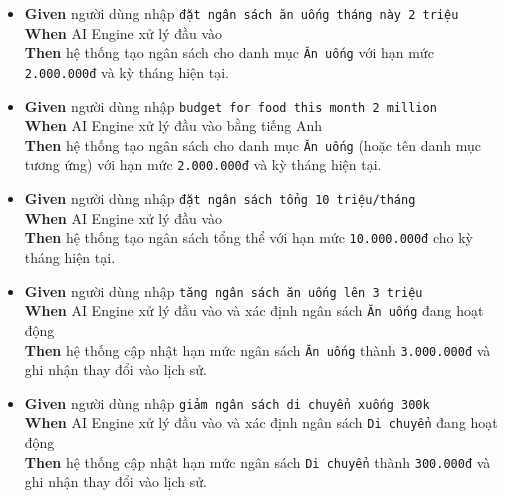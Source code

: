 \begin{itemize}
\item \textbf{Given} người dùng nhập \texttt{đặt ngân sách ăn uống tháng này 2 triệu}  \\ \hspace*{1.5em}  \textbf{When} AI Engine xử lý đầu vào  \\ \hspace*{1.5em}  \textbf{Then} hệ thống tạo ngân sách cho danh mục \texttt{Ăn uống} với hạn mức \texttt{2.000.000đ} và kỳ tháng hiện tại.
\item \textbf{Given} người dùng nhập \texttt{budget for food this month 2 million}  \\ \hspace*{1.5em}  \textbf{When} AI Engine xử lý đầu vào bằng tiếng Anh  \\ \hspace*{1.5em}  \textbf{Then} hệ thống tạo ngân sách cho danh mục \texttt{Ăn uống} (hoặc tên danh mục tương ứng) với hạn mức \texttt{2.000.000đ} và kỳ tháng hiện tại.
\item \textbf{Given} người dùng nhập \texttt{đặt ngân sách tổng 10 triệu/tháng}  \\ \hspace*{1.5em}  \textbf{When} AI Engine xử lý đầu vào  \\ \hspace*{1.5em}  \textbf{Then} hệ thống tạo ngân sách tổng thể với hạn mức \texttt{10.000.000đ} cho kỳ tháng hiện tại.
\item \textbf{Given} người dùng nhập \texttt{tăng ngân sách ăn uống lên 3 triệu}  \\ \hspace*{1.5em}  \textbf{When} AI Engine xử lý đầu vào và xác định ngân sách \texttt{Ăn uống} đang hoạt động  \\ \hspace*{1.5em}  \textbf{Then} hệ thống cập nhật hạn mức ngân sách \texttt{Ăn uống} thành \texttt{3.000.000đ} và ghi nhận thay đổi vào lịch sử.
\item \textbf{Given} người dùng nhập \texttt{giảm ngân sách di chuyển xuống 300k}  \\ \hspace*{1.5em}  \textbf{When} AI Engine xử lý đầu vào và xác định ngân sách \texttt{Di chuyển} đang hoạt động  \\ \hspace*{1.5em}  \textbf{Then} hệ thống cập nhật hạn mức ngân sách \texttt{Di chuyển} thành \texttt{300.000đ} và ghi nhận thay đổi vào lịch sử.

\end{itemize}

